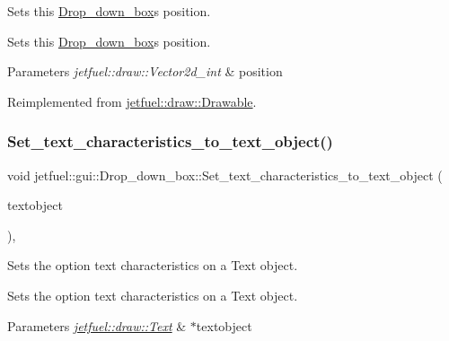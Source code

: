 Sets this \hyperlink{classjetfuel_1_1gui_1_1Drop__down__box}{Drop\+\_\+down\+\_\+box}\textquotesingle{}s position. 

Sets this \hyperlink{classjetfuel_1_1gui_1_1Drop__down__box}{Drop\+\_\+down\+\_\+box}\textquotesingle{}s position.


\begin{DoxyParams}{Parameters}
{\em jetfuel\+::draw\+::\+Vector2d\+\_\+int} & position \\
\hline
\end{DoxyParams}


Reimplemented from \hyperlink{classjetfuel_1_1draw_1_1Drawable_afdd035afe40c706459a6c9df813bcce6}{jetfuel\+::draw\+::\+Drawable}.

\mbox{\label{classjetfuel_1_1gui_1_1Drop__down__box_ad8df2088af8ede79c0747e89647b060d}} 
\subsubsection{\texorpdfstring{Set\+\_\+text\+\_\+characteristics\+\_\+to\+\_\+text\+\_\+object()}{Set\_text\_characteristics\_to\_text\_object()}}
{\footnotesize\ttfamily void jetfuel\+::gui\+::\+Drop\+\_\+down\+\_\+box\+::\+Set\+\_\+text\+\_\+characteristics\+\_\+to\+\_\+text\+\_\+object (\begin{DoxyParamCaption}\item[{\hyperlink{classjetfuel_1_1draw_1_1Text}{jetfuel\+::draw\+::\+Text} $\ast$}]{textobject }\end{DoxyParamCaption})\hspace{0.3cm}{\ttfamily [inline]}, {\ttfamily [protected]}}



Sets the option text characteristics on a Text object. 

Sets the option text characteristics on a Text object.


\begin{DoxyParams}{Parameters}
{\em \hyperlink{classjetfuel_1_1draw_1_1Text}{jetfuel\+::draw\+::\+Text}} & $\ast$textobject \\
\hline
\end{DoxyParams}
\mbox{\label{classjetfuel_1_1gui_1_1Drop__down__box_acb6540d9d5230dae1a9e3ecaf6949708}} 

